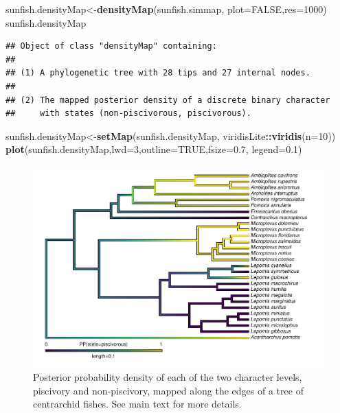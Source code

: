 \documentclass[fleqn,10pt,lineno]{wlpeerj} %
\newenvironment{Shaded}{\begin{snugshade}}{\end{snugshade}}
\newcommand{\AttributeTok}[1]{\textcolor[rgb]{0.13,0.29,0.53}{#1}}
\newcommand{\ConstantTok}[1]{\textcolor[rgb]{0.56,0.35,0.01}{#1}}
\newcommand{\DecValTok}[1]{\textcolor[rgb]{0.00,0.00,0.81}{#1}}
\newcommand{\FloatTok}[1]{\textcolor[rgb]{0.00,0.00,0.81}{#1}}
\newcommand{\FunctionTok}[1]{\textcolor[rgb]{0.13,0.29,0.53}{\textbf{#1}}}
\newcommand{\NormalTok}[1]{#1}
\newcommand{\OtherTok}[1]{\textcolor[rgb]{0.56,0.35,0.01}{#1}}
\newcommand{\SpecialCharTok}[1]{\textcolor[rgb]{0.81,0.36,0.00}{\textbf{#1}}}
\begin{document}
\begin{Shaded}
\begin{Highlighting}[]
\NormalTok{sunfish.densityMap}\OtherTok{\textless{}{-}}\FunctionTok{densityMap}\NormalTok{(sunfish.simmap,}
  \AttributeTok{plot=}\ConstantTok{FALSE}\NormalTok{,}\AttributeTok{res=}\DecValTok{1000}\NormalTok{)}
\NormalTok{sunfish.densityMap}
\end{Highlighting}
\end{Shaded}

\begin{verbatim}
## Object of class "densityMap" containing:
## 
## (1) A phylogenetic tree with 28 tips and 27 internal nodes.
## 
## (2) The mapped posterior density of a discrete binary character
##     with states (non-piscivorous, piscivorous).
\end{verbatim}

\begin{Shaded}
\begin{Highlighting}[]
\NormalTok{sunfish.densityMap}\OtherTok{\textless{}{-}}\FunctionTok{setMap}\NormalTok{(sunfish.densityMap,}
\NormalTok{  viridisLite}\SpecialCharTok{::}\FunctionTok{viridis}\NormalTok{(}\AttributeTok{n=}\DecValTok{10}\NormalTok{))}
\FunctionTok{plot}\NormalTok{(sunfish.densityMap,}\AttributeTok{lwd=}\DecValTok{3}\NormalTok{,}\AttributeTok{outline=}\ConstantTok{TRUE}\NormalTok{,}\AttributeTok{fsize=}\FloatTok{0.7}\NormalTok{,}
  \AttributeTok{legend=}\FloatTok{0.1}\NormalTok{)}
\end{Highlighting}
\end{Shaded}

\begin{figure}
\includegraphics[width=1\linewidth]{Revell.phytools-v2_peerj_files/figure-latex/densityMap-1} \caption{Posterior probability density of each of the two character levels, piscivory and non-piscivory, mapped along the edges of a tree of centrarchid fishes. See main text for more details.}\label{fig:densityMap}
\end{figure}
\end{document}
